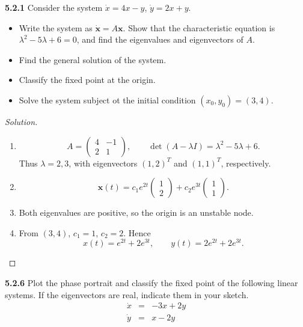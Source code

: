 \documentclass[10pt]{amsart}
\newenvironment{solution}
{\begin{proof}[Solution]}
{\end{proof}}
\begin{document}
\begin{onehalfspace}
        \noindent\textbf{5.2.1} Consider the system $\dot{x} = 4x - y$, $\dot{y} = 2x + y$.
        \begin{itemize}
            \item[a)] Write the system as $\mathbf{\dot{x}} = A \mathbf{x}$.
            Show that the characteristic equation is $\lambda^2 - 5\lambda + 6 = 0$,
            and find the eigenvalues and eigenvectors of $A$.
            \item[b)] Find the general solution of the system.
            \item[c)] Classify the fixed point at the origin.
            \item[d)] Solve the system subject ot the initial condition $(x_0, y_0) = (3, 4)$.
        \end{itemize}

        \begin{solution}
\begin{enumerate}[label=(\alph*)]
\item
\[A=\begin{pmatrix}4&-1\\2&1\end{pmatrix},\qquad \det(A-\lambda I)=\lambda^2-5\lambda+6.\]
Thus $\lambda=2,3$, with eigenvectors $(1,2)^T$ and $(1,1)^T$, respectively.
\item
\[\mathbf{x}(t)=c_1e^{2t}\begin{pmatrix}1\\2\end{pmatrix}+c_2e^{3t}\begin{pmatrix}1\\1\end{pmatrix}.\]
\item Both eigenvalues are positive, so the origin is an unstable node.
\item From $(3,4)$, $c_1=1$, $c_2=2$. Hence
\[x(t)=e^{2t}+2e^{3t},\qquad y(t)=2e^{2t}+2e^{3t}.\]
\end{enumerate}
\end{solution}

        \noindent\textbf{5.2.6} Plot the phase portrait and classify the fixed point of the following
        linear systems.
        If the eigenvectors are real, indicate them in your sketch.
        \begin{eqnarray*}
            \dot{x} & = & -3x + 2y \\
            \dot{y} & = & x - 2y
        \end{eqnarray*}


\end{onehalfspace}
\end{document}
